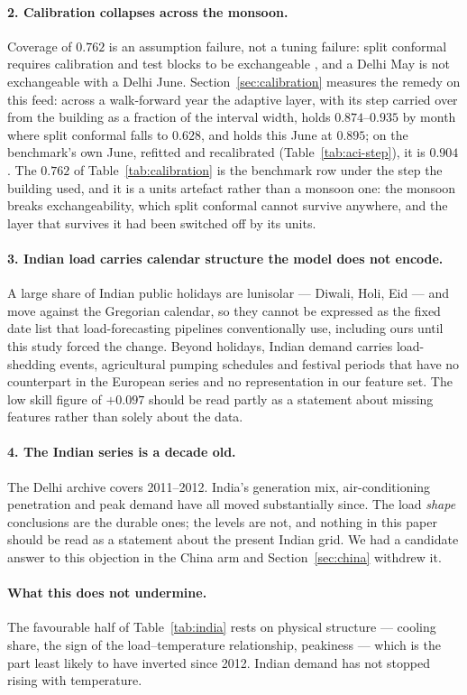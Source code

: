 \paragraph{2. Calibration collapses across the monsoon.} Coverage of $0.762$ is
an assumption failure, not a tuning failure: split conformal requires
calibration and test blocks to be exchangeable
\citep{vovk2005algorithmic,romano2019cqr}, and a Delhi May is not exchangeable
with a Delhi June. Section~\ref{sec:calibration} measures the remedy on this
feed: across a walk-forward year the adaptive layer, with its step carried over
from the building as a fraction of the interval width, holds $0.874$--$0.935$
by month where split conformal falls to $0.628$, and holds this June at
$0.895$; on the benchmark's own June, refitted and recalibrated
(Table~\ref{tab:aci-step}), it is $0.904$. The $0.762$ of
Table~\ref{tab:calibration} is the benchmark row under the step the building
used, and it is a units artefact rather than a monsoon one: the monsoon breaks
exchangeability, which split conformal cannot survive anywhere, and the layer
that survives it had been switched off by its units.

\paragraph{3. Indian load carries calendar structure the model does not encode.}
A large share of Indian public holidays are lunisolar --- Diwali, Holi, Eid ---
and move against the Gregorian calendar, so they cannot be expressed as the
fixed date list that load-forecasting pipelines conventionally use, including
ours until this study forced the change. Beyond holidays, Indian demand carries
load-shedding events, agricultural pumping schedules and festival periods that
have no counterpart in the European series and no representation in our feature
set. The low skill figure of $+0.097$ should be read partly as a statement about
missing features rather than solely about the data.

\paragraph{4. The Indian series is a decade old.} The Delhi archive covers
2011--2012. India's generation mix, air-conditioning penetration and peak demand
have all moved substantially since. The load \emph{shape} conclusions are the
durable ones; the levels are not, and nothing in this paper should be read as a
statement about the present Indian grid. We had a candidate answer to this
objection in the China arm and Section~\ref{sec:china} withdrew it.

\paragraph{What this does not undermine.} The favourable half of
Table~\ref{tab:india} rests on physical structure --- cooling share, the sign of
the load--temperature relationship, peakiness --- which is the part least likely
to have inverted since 2012. Indian demand has not stopped rising with
temperature.
